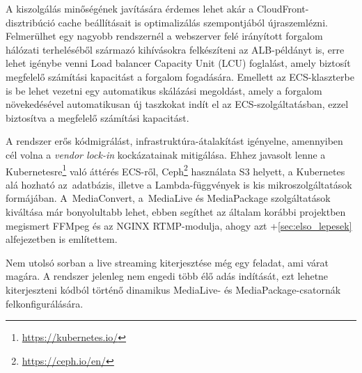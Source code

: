 A kiszolgálás minőségének javítására érdemes lehet akár a CloudFront-disztribúció cache beállításait is optimalizálás szempontjából újraszemlézni. Felmerülhet egy nagyobb rendszernél a webszerver felé irányított forgalom hálózati terheléséből származó kihívásokra felkészíteni az ALB-példányt is, erre lehet igénybe venni Load balancer Capacity Unit (LCU) foglalást, amely biztosít megfelelő számítási kapacitást a forgalom fogadására. Emellett az ECS-klaszterbe is be lehet vezetni egy automatikus skálázási megoldást, amely a forgalom növekedésével automatikusan új taszkokat indít el az ECS-szolgáltatásban, ezzel biztosítva a megfelelő számítási kapacitást.

A rendszer erős kódmigrálást, infrastruktúra-átalakítást igényelne, amennyiben cél volna a \emph{vendor lock-in}\cite{lockIn} kockázatainak mitigálása. Ehhez javasolt lenne a Kubernetesre\footnote{\url{https://kubernetes.io/}} való áttérés ECS-ről\cite{k8s}, Ceph\footnote{\url{https://ceph.io/en/}} használata S3 helyett, a Kubernetes alá hozható az~adatbázis, illetve a Lambda-függvények is kis mikroszolgáltatások formájában. A~MediaConvert, a~MediaLive és MediaPackage szolgáltatások kiváltása már bonyolultabb lehet, ebben segíthet az általam korábbi projektben megismert FFMpeg és az NGINX RTMP\leavevmode\hbox{-}modulja\cite{rtmpNginx}, ahogy azt \az+\ref{sec:elso_lepesek} alfejezetben is említettem.

Nem utolsó sorban a live streaming kiterjesztése még egy feladat, ami várat magára. A rendszer jelenleg nem engedi több élő adás indítását, ezt lehetne kiterjeszteni kódból történő dinamikus MediaLive- és MediaPackage-csatornák felkonfigurálására.

